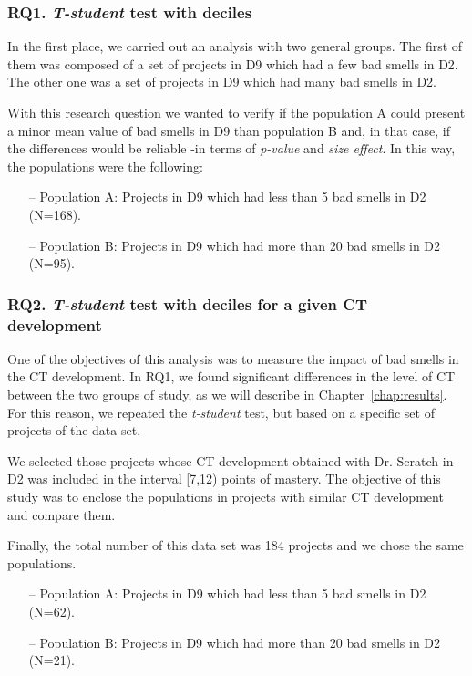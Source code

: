 \subsubsection{RQ1. \textit{T-student} test with deciles}
\label{subsubsec:rq1_t_student_deciles}

In the first place, we carried out an analysis with two general groups. The first of them was composed of a set of projects in D9 which had a few bad smells in D2. The other one was a set of projects in D9 which had many bad smells in D2. 

With this research question we wanted to verify if the population A could present a minor mean value of bad smells in D9 than population B and, in that case, if the differences would be reliable -in terms of \textit{p-value} and \textit{size effect}. In this way, the populations were the following:

\begin{itemize}
    \item[--] Population A: Projects in D9 which had less than 5 bad smells in D2 (N=168).
    \item[--] Population B: Projects in D9 which had more than 20 bad smells in D2 (N=95).
\end{itemize}


\subsubsection{RQ2. \textit{T-student} test with deciles for a given CT development}
\label{subsubsec:rq2_t_student_deciles_ct}

One of the objectives of this analysis was to measure the impact of bad smells in the CT development. In RQ1, we found significant differences in the level of CT between the two groups of study, as we will describe in Chapter~\ref{chap:results}. For this reason, we repeated the \textit{t-student} test, but based on a specific set of projects of the data set. 

We selected those projects whose CT development obtained with Dr. Scratch in D2 was included in the interval [7,12) points of mastery. The objective of this study was to enclose the populations in projects with similar CT development and compare them.

Finally, the total number of this data set was 184 projects and we chose the same populations.

\begin{itemize}
    \item[--] Population A: Projects in D9 which had less than 5 bad smells in D2 (N=62).
    \item[--] Population B: Projects in D9 which had more than 20 bad smells in D2 (N=21).
\end{itemize}



